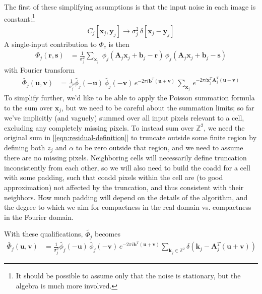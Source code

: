 \documentclass[DM,authoryear,toc]{lsstdoc}
\begin{document}
The first of these simplifying assumptions is that the input noise in each image is constant:\footnote{It should be possible to assume only that the noise is stationary, but the algebra is much more involved.}
\begin{align}
    C_j[\symbf{x}_j, \symbf{y}_j] \rightarrow \sigma_j^2 \, \delta[\symbf{x}_j-\symbf{y}_j]
\end{align}
A single-input contribution to $\Phi_c$ is then
\begin{align}
    \Phi_j(\symbf{r}, \symbf{s}) &= \frac{1}{\sigma_j^2} \sum_{\symbf{x}_j} \;
        ϕ_j\!\left(\symbf{A}_j\symbf{x}_j + \symbf{b}_j - \symbf{r}\right) \,
        ϕ_j\!\left(\symbf{A}_j\symbf{x}_j + \symbf{b}_j - \symbf{s}\right)
\end{align}
with Fourier transform
\begin{align}
    \widetilde{\Phi_j}(\symbf{u}, \symbf{v}) &= \frac{1}{\sigma_j^2}
        \widetilde{\phi_j}(-\symbf{u}) \, \widetilde{\phi_j}(-\symbf{v}) \,
        e^{-2\pi i \symbf{b}^T(\symbf{u}+\symbf{v})} \,
        \sum_{\symbf{x}_j} \, e^{-2\pi i \symbf{x}_j^{T} \symbf{A}_j^T (\symbf{u} + \symbf{v})}
\end{align}
To simplify further, we'd like to be able to apply the Poisson summation formula to the sum over $\symbf{x}_j$, but we need to be careful about the summation limits; so far we've implicitly (and vaguely) summed over all input pixels relevant to a cell, excluding any completely missing pixels.
To instead sum over $\mathbb{Z}^2$, we need the original sum in [\ref{eqn:residual-definition}] to truncate outside some finite region by defining both $z_j$ and $\alpha$ to be zero outside that region, and we need to assume there are no missing pixels.
Neighboring cells will necessarily define truncation inconsistently from each other, so we will also need to build the coadd for a cell with some padding, such that coadd pixels within the cell are (to good approximation) not affected by the truncation, and thus consistent with their neighbors.
How much padding will depend on the details of the algorithm, and the degree to which we aim for compactness in the real domain vs. compactness in the Fourier domain.

With these qualifications, $\widetilde{\Phi_j}$ becomes
\begin{align}
    \widetilde{\Phi_j}(\symbf{u}, \symbf{v}) &= \frac{1}{\sigma_j^2}
        \widetilde{\phi_j}(-\symbf{u}) \, \widetilde{\phi_j}(-\symbf{v}) \,
        e^{-2\pi i \symbf{b}^T(\symbf{u}+\symbf{v})} \!
        \sum_{\symbf{k}_j \in \mathbb{Z}^2}
            \delta\left(\symbf{k}_j - \symbf{A}_j^T (\symbf{u} + \symbf{v}) \right)
\end{align}
\end{document}
